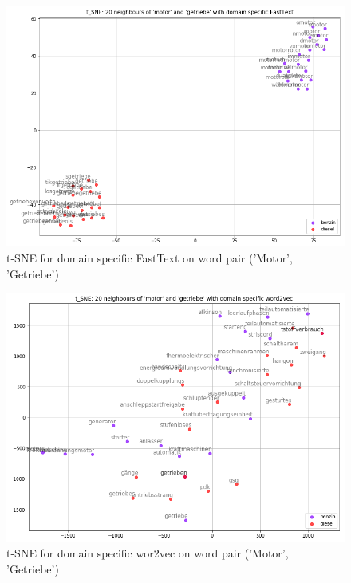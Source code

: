 \documentclass[10pt,a4paper]{article}
\begin{document}
\begin{figure}
	\begin{center}
		\includegraphics[scale=0.4]{./Pictures/model_ds_ft_motor_getriebe.png}
		
		\caption{t-SNE for domain specific FastText on word pair ('Motor', 'Getriebe')}
	\end{center}
\end{figure}

\begin{figure}
	\begin{center}
		\includegraphics[scale=0.4]{./Pictures/model_ds_w2v_motor_getriebe.png}
		\caption{t-SNE for domain specific wor2vec on word pair ('Motor', 'Getriebe')}
	\end{center}	
\end{figure}
\end{document}
